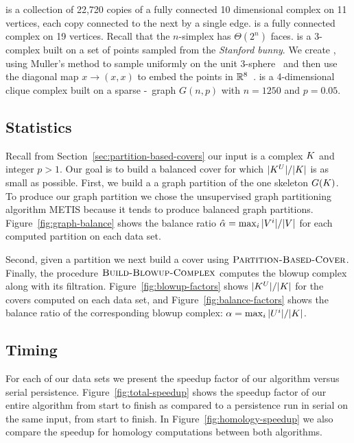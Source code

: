 \documentclass{jocg}
\begin{document}
{\blobs} is a collection of
22,720 copies of a fully connected 10 dimensional complex on 11 vertices, each 
copy connected to the next by a single edge. {\clique} is a fully 
connected complex on 19 vertices. Recall that the $n$-simplex has $\Theta(2^n)$ 
faces. {\bunny} is a 3-complex built on a set of points sampled from the 
\emph{Stanford bunny}. We create {\sphere}, using Muller's method to sample 
uniformly on the unit 3-sphere~\cite{m-nmgpuns-59} and then use the diagonal map
$x \rightarrow (x,x)$ to embed the points in $\mathbb{R}^8$~\cite{hatcher}. {\gnp} is a 
4-dimensional clique complex built on a sparse \Erdos-\Renyi\ graph $G(n,p)$ 
with $n = 1250$ and $p = 0.05$.
 
\subsection{Statistics}

Recall from Section~\ref{sec:partition-based-covers} our input is a complex
$K$ and integer $p > 1$. Our goal is to build a balanced cover for 
which $|K^{U}|/|K|$ is as small as possible. First, we build a a graph partition of
the one skeleton $G(K)$. To produce our graph partition we chose the
unsupervised graph partitioning algorithm METIS because it tends to produce 
balanced graph partitions. Figure~\ref{fig:graph-balance} shows the balance
ratio $\hat{\alpha} = \max_i{|V^i|}/|V|$ for each computed partition
on each data set.

Second, given a partition we next build a cover using 
$\textnormal{\scshape Partition-Based-Cover}$. Finally, the procedure 
$\textnormal{\scshape Build-Blowup-Complex}$ computes the blowup complex along with
its filtration. Figure~\ref{fig:blowup-factors} shows $|K^{U}|/|K|$ for 
the covers computed on each data set, and Figure~\ref{fig:balance-factors} 
shows the balance ratio of the corresponding blowup complex: 
$\alpha = \max_i{|U^i|}/|K|$.

 
\subsection{Timing}

For each of our data sets we present the speedup factor of
our algorithm versus serial persistence. Figure~\ref{fig:total-speedup}
shows the speedup factor of our entire algorithm from start to finish as 
compared to a persistence run in serial on the same input, from start to 
finish. In Figure~\ref{fig:homology-speedup} we also compare the speedup for 
homology computations between both algorithms.
\end{document}
